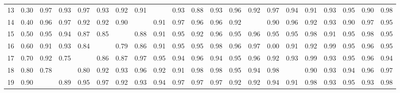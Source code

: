 \begin{table}[ht]
\begin{tabular}{rrrrrrrrrrrrrrrrrrrrr}
  13 & 0.30 & 0.97 & 0.93 & 0.97 & 0.93 & 0.92 & 0.91 &  & 0.93 & 0.88 & 0.93 & 0.96 & 0.92 & 0.97 & 0.94 & 0.91 & 0.93 & 0.95 & 0.90 & 0.98 \\ 
  14 & 0.40 & 0.96 & 0.97 & 0.92 & 0.92 & 0.90 &  & 0.91 & 0.97 & 0.96 & 0.96 & 0.92 &  & 0.90 & 0.96 & 0.92 & 0.93 & 0.90 & 0.97 & 0.95 \\ 
  15 & 0.50 & 0.95 & 0.94 & 0.87 & 0.85 &  & 0.88 & 0.91 & 0.95 & 0.92 & 0.96 & 0.95 & 0.96 & 0.95 & 0.95 & 0.98 & 0.91 & 0.95 & 0.98 & 0.95 \\ 
  16 & 0.60 & 0.91 & 0.93 & 0.84 &  & 0.79 & 0.86 & 0.91 & 0.95 & 0.95 & 0.98 & 0.96 & 0.97 & 0.00 & 0.91 & 0.92 & 0.99 & 0.95 & 0.96 & 0.95 \\ 
  17 & 0.70 & 0.92 & 0.75 &  & 0.86 & 0.87 & 0.97 & 0.95 & 0.94 & 0.96 & 0.94 & 0.95 & 0.96 & 0.92 & 0.93 & 0.99 & 0.93 & 0.95 & 0.96 & 0.94 \\ 
  18 & 0.80 & 0.78 &  & 0.80 & 0.92 & 0.93 & 0.96 & 0.92 & 0.91 & 0.98 & 0.98 & 0.95 & 0.94 & 0.98 &  & 0.90 & 0.93 & 0.94 & 0.96 & 0.97 \\ 
  19 & 0.90 &  & 0.89 & 0.95 & 0.97 & 0.92 & 0.93 & 0.94 & 0.97 & 0.97 & 0.97 & 0.92 & 0.92 & 0.94 & 0.91 & 0.98 & 0.93 & 0.95 & 0.93 & 0.98 \\ 
   \hline
\end{tabular}
\end{table}
